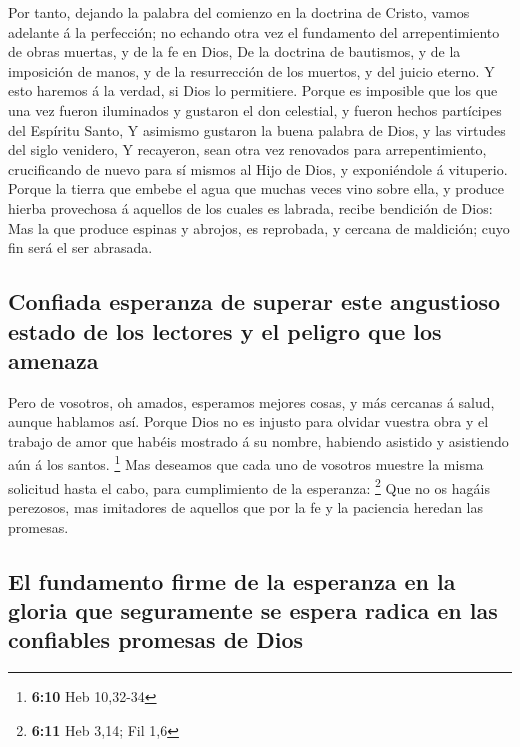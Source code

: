  Por tanto, dejando la palabra del comienzo en la doctrina
de Cristo, vamos adelante á la perfección; no echando otra vez el
fundamento del arrepentimiento de obras muertas, y de la fe en Dios,
 De la doctrina de bautismos, y de la imposición de manos, y
de la resurrección de los muertos, y del juicio eterno.  Y
esto haremos á la verdad, si Dios lo permitiere.  Porque es
imposible que los que una vez fueron iluminados y gustaron el don
celestial, y fueron hechos partícipes del Espíritu Santo,  Y
asimismo gustaron la buena palabra de Dios, y las virtudes del siglo
venidero,  Y recayeron, sean otra vez renovados para
arrepentimiento, crucificando de nuevo para sí mismos al Hijo de Dios, y
exponiéndole á vituperio.  Porque la tierra que embebe el
agua que muchas veces vino sobre ella, y produce hierba provechosa á
aquellos de los cuales es labrada, recibe bendición de Dios:
 Mas la que produce espinas y abrojos, es reprobada, y
cercana de maldición; cuyo fin será el ser abrasada.

\hypertarget{confiada-esperanza-de-superar-este-angustioso-estado-de-los-lectores-y-el-peligro-que-los-amenaza}{%
\subsection{Confiada esperanza de superar este angustioso estado de los
lectores y el peligro que los
amenaza}\label{confiada-esperanza-de-superar-este-angustioso-estado-de-los-lectores-y-el-peligro-que-los-amenaza}}

 Pero de vosotros, oh amados, esperamos mejores cosas, y más
cercanas á salud, aunque hablamos así.  Porque Dios no es
injusto para olvidar vuestra obra y el trabajo de amor que habéis
mostrado á su nombre, habiendo asistido y asistiendo aún á los santos.
\footnote{\textbf{6:10} Heb 10,32-34}  Mas deseamos que
cada uno de vosotros muestre la misma solicitud hasta el cabo, para
cumplimiento de la esperanza: \footnote{\textbf{6:11} Heb 3,14; Fil 1,6}
 Que no os hagáis perezosos, mas imitadores de aquellos que
por la fe y la paciencia heredan las promesas.

\hypertarget{el-fundamento-firme-de-la-esperanza-en-la-gloria-que-seguramente-se-espera-radica-en-las-confiables-promesas-de-dios}{%
\subsection{El fundamento firme de la esperanza en la gloria que
seguramente se espera radica en las confiables promesas de
Dios}\label{el-fundamento-firme-de-la-esperanza-en-la-gloria-que-seguramente-se-espera-radica-en-las-confiables-promesas-de-dios}}

